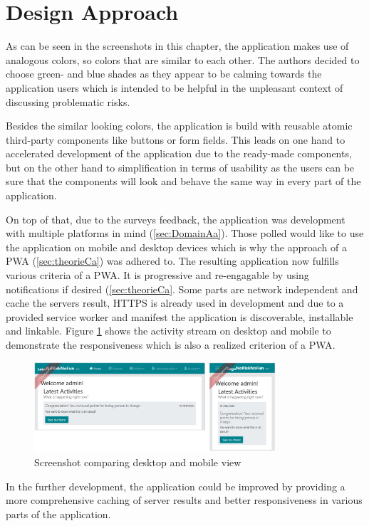
\section{Design Approach}
\label{sec:implementationDesign}

As can be seen in the screenshots in this chapter, the application makes use of analogous colors, so colors that are similar to each other. The authors decided to choose green- and blue shades as they appear to be calming towards the application users which is intended to be helpful in the unpleasant context of discussing problematic risks.

Besides the similar looking colors, the application is build with reusable atomic third-party components like buttons or form fields. This leads on one hand to accelerated development of the application due to the ready-made components, but on the other hand to simplification in terms of usability as the users can be sure that the components will look and behave the same way in every part of the application.

On top of that, due to the surveys feedback, the application was development with multiple platforms in mind (\ref{sec:DomainAa}). Those polled would like to use the application on mobile and desktop devices which is why the approach of a  \acs{PWA} (\ref{sec:theorieCa}) was adhered to. The resulting application now fulfills various criteria of a PWA. It is progressive and re-engagable by using notifications if desired (\ref{sec:theorieCa}. Some parts are network independent and cache the servers result, HTTPS is already used in development and due to a provided service worker and manifest the application is discoverable, installable and linkable. Figure \ref{fig:activitystreamcombined} shows the activity stream on desktop and mobile to demonstrate the responsiveness which is also a realized criterion of a  \acs{PWA}.

\begin{figure}[H]
	\centering
	\includegraphics[width=0.8\textwidth]{Assets/implementation_shots/activitystreamcombined.png}
	\caption{Screenshot comparing desktop and mobile view}
	\label{fig:activitystreamcombined}
\end{figure}

In the further development, the application could be improved by providing a more comprehensive caching of server results and better responsiveness in various parts of the application.
